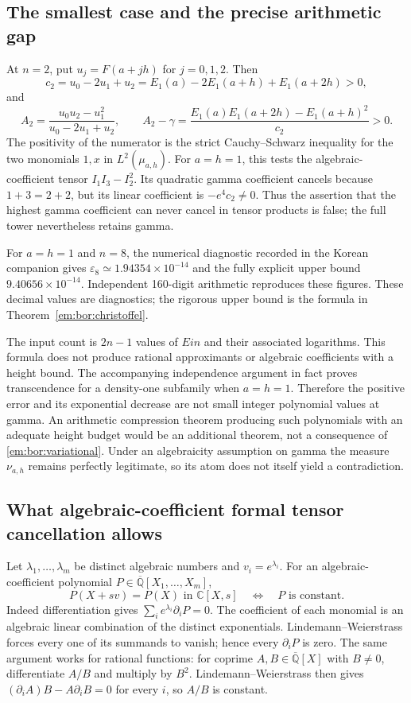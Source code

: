 \documentclass[11pt,a4paper]{article}
\theoremstyle{definition}
\theoremstyle{remark}
\theoremstyle{plain}
\numberwithin{equation}{section}
\def\operatorname#1{#1}\def\mathrm#1{#1}}
\begin{document}
\subsection{The smallest case and the precise arithmetic gap}
At $n=2$, put $u_j=F(a+jh)$ for $j=0,1,2$.  Then
\[
 c_2=u_0-2u_1+u_2
     =E_1(a)-2E_1(a+h)+E_1(a+2h)>0,
\]
and
\[
 A_2=\frac{u_0u_2-u_1^2}{u_0-2u_1+u_2},\qquad
 A_2-\gamma
 =\frac{E_1(a)E_1(a+2h)-E_1(a+h)^2}{c_2}>0.
\]
The positivity of the numerator is the strict Cauchy--Schwarz
inequality for the two monomials $1,x$ in $L^2(\mu_{a,h})$.
For $a=h=1$, this tests the algebraic-coefficient tensor
$I_1I_3-I_2^2$.  Its quadratic gamma coefficient cancels because
$1+3=2+2$, but its linear coefficient is $-e^4c_2\ne0$.
Thus the assertion that the highest gamma coefficient can never cancel
in tensor products is false; the full tower nevertheless retains gamma.

For $a=h=1$ and $n=8$, the numerical diagnostic recorded in the Korean
companion gives $\varepsilon_8\simeq1.94354\times10^{-14}$ and the
fully explicit upper bound $9.40656\times10^{-14}$. Independent
160-digit arithmetic reproduces these figures. These decimal values
are diagnostics; the rigorous upper bound is the formula in
Theorem~\ref{em:bor:christoffel}.

The input count is $2n-1$ values of $\operatorname{Ein}$ and their
associated logarithms.  This formula does not produce rational approximants or
algebraic coefficients with a height bound.  The accompanying
independence argument in fact proves transcendence for a density-one
subfamily when $a=h=1$.  Therefore the positive error and its exponential
decrease are not small integer polynomial values at gamma.  An arithmetic compression theorem producing such
polynomials with an adequate height budget would be an additional
theorem, not a consequence of \eqref{em:bor:variational}.  Under an
algebraicity assumption on gamma the measure $\nu_{a,h}$ remains
perfectly legitimate, so its atom does not itself yield a contradiction.

\subsection{What algebraic-coefficient formal tensor cancellation allows}
Let $\lambda_1,\ldots,\lambda_m$ be distinct algebraic numbers and
$v_i=e^{\lambda_i}$.  For an algebraic-coefficient polynomial
$P\in\overline{\mathbb Q}[X_1,\ldots,X_m]$,
\begin{equation}\label{em:bor:formal-invariants}
 P(X+sv)=P(X)\text{ in }\mathbb C[X,s]
 \quad\Longleftrightarrow\quad P\text{ is constant}.
\end{equation}
Indeed differentiation gives
$\sum_i e^{\lambda_i}\partial_iP=0$.
The coefficient of each monomial is an algebraic linear combination of
the distinct exponentials.  Lindemann--Weierstrass forces every one of
its summands to vanish; hence every $\partial_iP$ is zero.
The same argument works for rational functions: for coprime
$A,B\in\overline{\mathbb Q}[X]$ with $B\ne0$, differentiate $A/B$
and multiply by $B^2$. Lindemann--Weierstrass then gives
$(\partial_iA)B-A\partial_iB=0$ for every $i$, so $A/B$ is constant.
\end{document}
